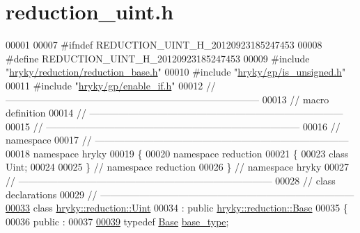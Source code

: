 \hypertarget{reduction__uint_8h_source}{\section{reduction\-\_\-uint.\-h}
}

\begin{DoxyCode}
00001 
00007 \textcolor{preprocessor}{#ifndef REDUCTION\_UINT\_H\_20120923185247453}
00008 \textcolor{preprocessor}{}\textcolor{preprocessor}{#define REDUCTION\_UINT\_H\_20120923185247453}
00009 \textcolor{preprocessor}{}\textcolor{preprocessor}{#include "\hyperlink{reduction__base_8h}{hryky/reduction/reduction_base.h}"}
00010 \textcolor{preprocessor}{#include "\hyperlink{is__unsigned_8h}{hryky/gp/is_unsigned.h}"}
00011 \textcolor{preprocessor}{#include "\hyperlink{enable__if_8h}{hryky/gp/enable_if.h}"}
00012 \textcolor{comment}{//
      ------------------------------------------------------------------------------}
00013 \textcolor{comment}{// macro definition}
00014 \textcolor{comment}{//
      ------------------------------------------------------------------------------}
00015 \textcolor{comment}{//
      ------------------------------------------------------------------------------}
00016 \textcolor{comment}{// namespace}
00017 \textcolor{comment}{//
      ------------------------------------------------------------------------------}
00018 \textcolor{keyword}{namespace }hryky
00019 \{
00020 \textcolor{keyword}{namespace }reduction
00021 \{
00023     \textcolor{keyword}{class }Uint;
00024 
00025 \} \textcolor{comment}{// namespace reduction}
00026 \} \textcolor{comment}{// namespace hryky}
00027 \textcolor{comment}{//
      ------------------------------------------------------------------------------}
00028 \textcolor{comment}{// class declarations}
00029 \textcolor{comment}{//
      ------------------------------------------------------------------------------}
\hypertarget{reduction__uint_8h_source_l00033}{}\hyperlink{classhryky_1_1reduction_1_1_uint}{00033} \textcolor{comment}{}\textcolor{keyword}{class }\hyperlink{classhryky_1_1reduction_1_1_uint}{hryky::reduction::Uint}
00034     : \textcolor{keyword}{public} \hyperlink{classhryky_1_1reduction_1_1_base}{hryky::reduction::Base}
00035 \{
00036 \textcolor{keyword}{public} :
00037 
\hypertarget{reduction__uint_8h_source_l00039}{}\hyperlink{classhryky_1_1reduction_1_1_uint_a52329a18511498d48091506a490f8c4a}{00039}     \textcolor{keyword}{typedef} \hyperlink{classhryky_1_1reduction_1_1_base}{Base}        \hyperlink{classhryky_1_1reduction_1_1_uint_a52329a18511498d48091506a490f8c4a}{base_type};

\end{DoxyCode}
